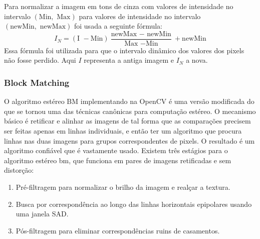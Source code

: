 \documentclass{bmvc2k}
\begin{document}
Para normalizar a imagem em tons de cinza com valores de intensidade no intervalo $(\mbox{Min}, \mbox{ Max})$ para valores de intensidade no intervalo $(\mbox{newMin}, \mbox{ newMax})$ foi usada a seguinte fórmula: $$I_N = (\mbox{I } - \mbox{Min})\frac{\mbox{newMax } - \mbox{ newMin}}{\mbox{Max } - \mbox{Min}} + \mbox{newMin}$$ Essa fórmula foi utilizada para que o intervalo dinâmico dos valores dos pixels não fosse perdido. Aqui $I$ representa a antiga imagem e $I_N$ a nova.
\subsubsection{Block Matching}
O algoritmo estéreo BM implementando na OpenCV é uma versão modificada do que se tornou uma das técnicas canônicas para computação estéreo. O mecanismo básico é retificar e alinhar as imagens de tal forma que as comparações precisem ser feitas apenas em linhas individuais, e então ter um algoritmo que procura linhas nas duas imagens para grupos correspondentes de pixels. O resultado é um algoritmo confiável que é vastamente usado. Existem três estágios para o algoritmo estéreo bm, que funciona em pares de imagens retificadas e sem distorção:
\begin{enumerate}
\item Pré-filtragem para normalizar o brilho da imagem e realçar a textura.
\item Busca por correspondência ao longo das linhas horizontais epipolares usando uma janela SAD.
\item Pós-filtragem para eliminar correspondências ruins de casamentos.
\end{enumerate}
\end{document}
